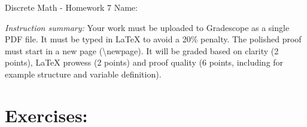\documentclass[12pt]{article}
\begin{document}
\begin{center}
	{\LARGE Discrete Math - Homework 7} \Large \newline
    Name:
\end{center}

\emph{Instruction summary:} Your work must be uploaded to Gradescope as a single PDF file. It must be typed in LaTeX to avoid a 20\% penalty. The polished proof must start in a new page (\textbackslash{newpage}). It will be graded based on clarity (2 points), LaTeX prowess (2 points) and proof quality (6 points, including for example structure and variable definition).

\section*{Exercises:}
\end{document}
